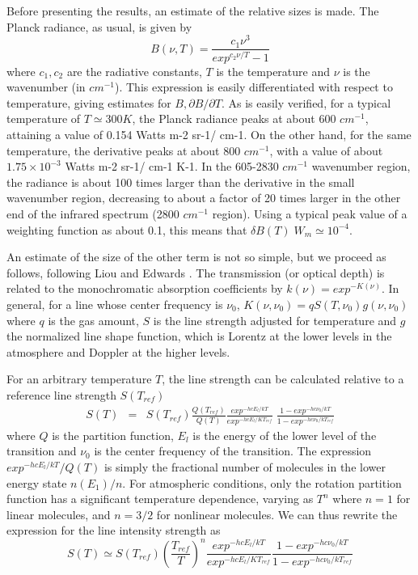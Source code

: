 \documentclass[11pt]{article}
\begin{document}
Before presenting the results, an estimate of the relative sizes is
made.  The Planck radiance, as usual, is given by
\begin{equation} 
B(\nu,T)=\frac{c_{1} \nu^{3}}{exp^{c_{2} \nu/T}-1}
\end{equation} 
where $c_1,c_2$ are the radiative constants, $T$ is the temperature and 
$\nu$ is the wavenumber (in $cm^{-1}$). This expression is easily 
differentiated with respect to temperature, giving estimates for 
$B, \partial B/\partial T$. As is easily verified, for a typical temperature 
of $T \simeq 300 K$, the Planck radiance peaks at about 600 $cm^{-1}$, 
attaining a value of
0.154 Watts m-2 sr-1/ cm-1. On the other hand, for the same
temperature, the derivative peaks at about 800 $cm^{-1}$, with a value
of about $1.75 \times 10^{-3}$ Watts m-2 sr-1/ cm-1 K-1. In the
605-2830 $cm^{-1}$ wavenumber region, the radiance is about 100 times
larger than the derivative in the small wavenumber region, decreasing
to about a factor of 20 times larger in the other end of the infrared
spectrum (2800 $cm^{-1}$ region). Using a typical peak value of a
weighting function as about 0.1, this means that $ \delta B(T) \;
W_{m} \simeq 10^{-4}$.

An estimate of the size of the other term is not so simple, but we
proceed as follows, following Liou \cite{lio:80} and Edwards
\cite{edw:92}.  The transmission (or optical depth) is related to the
monochromatic absorption coefficients by $k(\nu) = exp^{-K(\nu)}$.
In general, for a line whose center frequency is $\nu_{0}$,
$K(\nu,\nu_{0}) = q S(T,\nu_{0}) g(\nu,\nu_{0})$ where $q$ is the gas amount,
$S$ is the line strength adjusted for temperature and $g$ the normalized 
line shape function, which is Lorentz at the lower levels in the atmosphere 
and Doppler at the higher levels.

For an arbitrary temperature $T$, the line strength can be calculated
relative to a reference line strength $S(T_{ref})$
\cite{lio:92,edw:92,goo:89}
\begin{eqnarray*}
S(T) & = & S(T_{ref}) \frac{Q(T_{ref})}{Q(T)}
\frac{exp^{-hcE_{l}/kT}}{exp^{-hcE_{l}/KT_{ref}}} \;
\frac{1-exp^{-hc\nu_{0}/kT}}{1-exp^{-hc\nu_{0}/kT_{ref}}}
\end{eqnarray*}
where $Q$ is the partition function, $E_{l}$ is the energy of the
lower level of the transition and $\nu_{0}$ is the center frequency of
the transition. The expression $exp^{-hcE_{l}/kT}/Q(T)$ is
simply the fractional number of molecules in the lower energy state
$n(E_{1})/n$.  For atmospheric conditions, only the rotation
partition function has a significant temperature dependence, varying
as $T^{n}$ \cite{lio:80} where $n=1$ for linear molecules, and $n=3/2$ for
nonlinear molecules. We can thus rewrite the expression for
the line intensity strength as 
\begin{equation}
S(T) \simeq S(T_{ref}) \left( \frac{T_{ref}}{T} \right)^{n}
\frac{exp^{-hcE_{l}/kT}}{exp^{-hcE_{l}/KT_{ref}}} 
\frac{1-exp^{-hc\nu_{0}/kT}}{1-exp^{-hc\nu_{0}/kT_{ref}}}
\end{equation}
\end{document}
